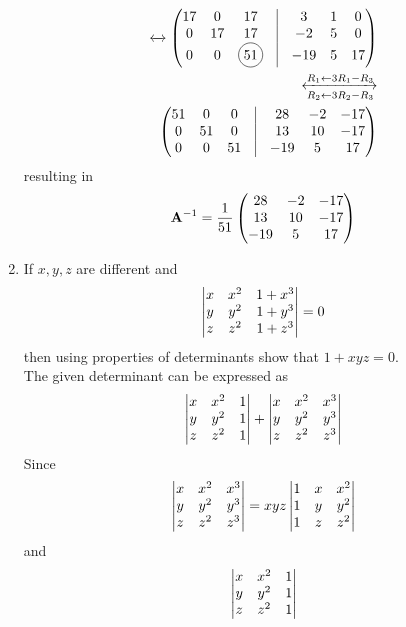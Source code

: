 \documentclass[journal,12pt,twocolumn]{IEEEtran}
\renewcommand\thesection{\arabic{section}}
\begin{document}
\begin{enumerate}[label=\thesection.\arabic*.,ref=\thesection.\theenumi]
\begin{align}
	\xleftrightarrow []{}
	\myvec{17 & 0 & 17 & \vrule & 3 & 1 & 0\\ 0 & 17 & 17 & \vrule & -2 & 5 & 0\\ 0 & 0 & \circled{51} & \vrule & -19 & 5 & 17}
	\\
	\xleftrightarrow [R_2\leftarrow 3R_2 - R_3]{R_1\leftarrow 3R_1 - R_3}
	\\
	\myvec{51 & 0 & 0 & \vrule & 28 & -2& -17\\ 0 & 51 & 0 & \vrule & 13 & 10 & -17\\ 0 & 0 & 51 & \vrule & -19 & 5 & 17}
    \end{align}
    resulting in 
\begin{align}
	\mathbf{A}^{-1} = \frac{1}{51}\begin{pmatrix} 28 & -2 & -17\\  13 & 10 & -17\\  -19 & 5 & 17\end{pmatrix}
    \end{align}
\item If $x,y,z$ are different and 
\begin{align}
	\begin{vmatrix}x & x^2 & 1+x^3 \\ y & y^2 & 1+y^3 \\ z & z^2 & 1+z^3 \end{vmatrix} =0 
	\label{eq:det_xyz_given}
    \end{align}
	then using properties of determinants show that $1+xyz=0.$  
	\\
	\solution The given determinant can be expressed as 
\begin{align}
	\begin{vmatrix}x & x^2 & 1 \\ y & y^2 & 1 \\ z & z^2 & 1\end{vmatrix}  
	+\begin{vmatrix}x & x^2 & x^3 \\ y & y^2 & y^3 \\ z & z^2 & z^3\end{vmatrix}  
	\label{eq:det_xyz}
    \end{align}
    Since
\begin{align}
	\begin{vmatrix}x & x^2 & x^3 \\ y & y^2 & y^3 \\ z & z^2 & z^3\end{vmatrix} 
	= xyz  
	\begin{vmatrix}1 & x & x^2 \\ 1 & y & y^2 \\ 1 & z & z^2\end{vmatrix}  
	\label{eq:det_xyz_2}
    \end{align}
    and 
\begin{align}
	\mydet{x & x^2 & 1 \\ y & y^2 & 1 \\ z & z^2 & 1} 

\end{align}
\end{enumerate}
\end{document}
